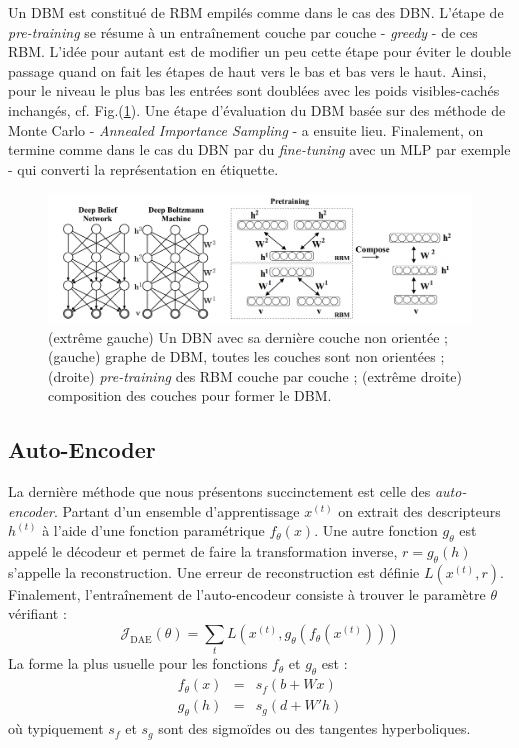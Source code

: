 \documentclass[10pt,a4paper]{article}
\begin{document}
Un DBM est constitué de RBM empilés comme dans le cas des DBN. L'étape de \emph{pre-training} se résume à un entraînement couche par couche - \emph{greedy} - de ces RBM. L'idée pour autant est de modifier un peu cette étape pour éviter le double passage quand on fait les étapes de haut vers le bas et bas vers le haut. Ainsi, pour le niveau le plus bas les entrées sont doublées avec les poids visibles-cachés inchangés, cf. Fig.(\ref{fig5}). Une étape d'évaluation du DBM basée sur des méthode de Monte Carlo - \emph{Annealed Importance Sampling} - a ensuite lieu. Finalement, on termine comme dans le cas du DBN par du \emph{fine-tuning} avec un MLP par exemple - qui converti la représentation en étiquette.

\begin{figure}[ht!]
\centering
\includegraphics[width = \columnwidth]{fig/dbm.png}
\caption{(extrême gauche) Un DBN avec sa dernière couche non orientée ; (gauche) graphe de DBM, toutes les couches sont non orientées ; (droite) \emph{pre-training} des RBM couche par couche ; (extrême droite) composition des couches pour former le DBM.}
\label{fig5}
\end{figure}




\subsection{Auto-Encoder}

La dernière méthode que nous présentons succinctement est celle des \emph{auto-encoder}. Partant d'un ensemble d'apprentissage $x^{(t)}$ on extrait des descripteurs $h^{(t)}$ à l'aide d'une fonction paramétrique $f_{\theta}(x)$. Une autre fonction $g_{\theta}$ est appelé le décodeur et permet de faire la transformation inverse, $r=g_{\theta}(h)$ s'appelle la reconstruction. Une erreur de reconstruction est définie $L(x^{(t)}, r)$. Finalement, l'entraînement de l'auto-encodeur consiste à trouver le paramètre $\theta$ vérifiant :
\begin{equation}
\mathcal{J}_{\text{DAE}}(\theta) = \sum_{t} L(x^{(t)}, g_{\theta}(f_{\theta}(x^{(t)})))
\end{equation}
La forme la plus usuelle pour les fonctions $f_{\theta}$ et $g_{\theta}$ est : 
\begin{equation}
\begin{array}{rll}
f_{\theta}(x) & = & s_f(b + Wx) \\
g_{\theta}(h) & = & s_g(d + W'h)
\end{array}
\end{equation}
où typiquement $s_f$ et $s_g$ sont des sigmoïdes ou des tangentes hyperboliques. 
\end{document}
